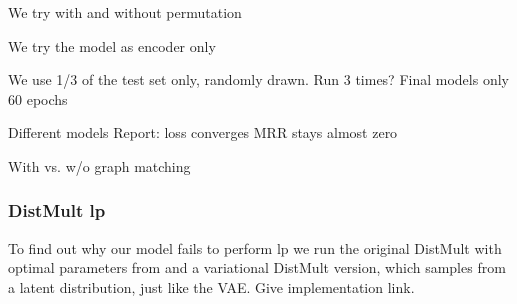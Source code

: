 





We try with and without permutation

We try the model as encoder only

We use 1/3 of the test set only, randomly drawn. Run 3 times?
Final models only 60 epochs



Different models
Report:
loss converges
MRR stays almost zero

With vs. w/o graph matching


\subsubsection{DistMult lp}
To find out why our model fails to perform lp we run the original DistMult with optimal parameters from \cite{ruffinelli_you_2019} and a variational DistMult version, which samples from a latent distribution, just like the VAE. Give implementation link.

